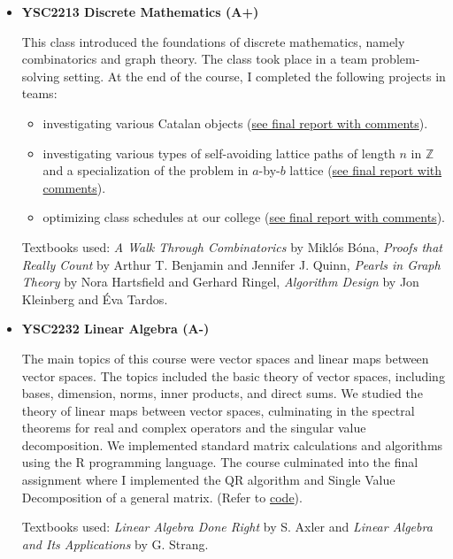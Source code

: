 \documentclass[11pt,reqno,oneside,a4paper]{article}
\begin{document}
\begin{itemize}
		\item \textbf{YSC2213 Discrete Mathematics (A+)}
		
		This class introduced the foundations of discrete mathematics, namely combinatorics and graph theory. The class took place in a team problem-solving setting. At the end of the course, I completed the following projects in teams:
		\begin{itemize}
		\item investigating various Catalan objects (\href{https://github.com/zhangliu6/course-submissions/blob/main/Project_1_Pyramid_Scheme_Comments_Zhang_Liu.pdf}{see final report with comments}).
		\item investigating various types of self-avoiding lattice paths of length $n$ in $\mathbb{Z}$ and a specialization of the problem in $a$-by-$b$ lattice (\href{https://github.com/zhangliu6/course-submissions/blob/main/Project_2_Dots.pdf}{see final report with comments}).
		\item optimizing class schedules at our college (\href{https://github.com/zhangliu6/course-submissions/blob/main/Report_3_Ketchup.pdf}{see final report with comments}).
		\end{itemize}

		Textbooks used:	\textit{A Walk Through Combinatorics} by Miklós Bóna, \textit{Proofs that Really Count} by Arthur T. Benjamin and Jennifer J. Quinn, \textit{Pearls in Graph Theory} by Nora Hartsfield and Gerhard Ringel, \textit{Algorithm Design} by Jon Kleinberg and Éva Tardos. 
		
		\item \textbf{YSC2232 Linear Algebra (A-) }
		
		\par The main topics of this course were vector spaces and linear maps between vector spaces. The topics included the basic theory of vector spaces, including bases, dimension, norms, inner products, and direct sums. We studied the theory of linear maps between vector spaces, culminating in the spectral theorems for real and complex operators and the singular value decomposition. We implemented standard matrix calculations and algorithms using the R programming language. The course culminated into the final assignment where I implemented the QR algorithm and Single Value Decomposition of a general matrix. (Refer to \href{https://github.com/zhangliu6/course-submissions/blob/main/Coding1-5.zip}{code}). 
		
		\par Textbooks used: \textit{Linear Algebra Done Right} by S. Axler and \textit{Linear Algebra and Its Applications} by G. Strang.
		

\end{itemize}
\end{document}
